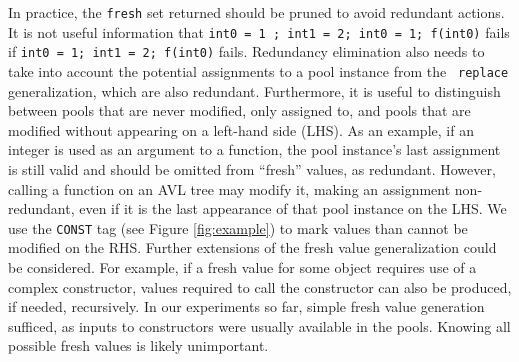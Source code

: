 In practice, the {\tt fresh} set returned should be pruned to avoid
redundant actions.  It is not useful information that {\tt int0 = 1 ; int1 = 2; int0 = 1; f(int0)} fails if {\tt int0 = 1;
  int1 = 2; f(int0)} fails.  Redundancy elimination also needs to take
into account the potential assignments to a pool instance from the {\tt
  replace} generalization, which are also redundant.  Furthermore, it
is useful to distinguish between pools that are never modified, only
assigned to, and pools that are modified without appearing on a
left-hand side (LHS).  As an example, if an integer is used as an argument
to a function, the pool instance's last assignment is still valid and
should be omitted from ``fresh'' values, as redundant.  However,
calling a function on an AVL tree may modify it, making an assignment
non-redundant, even if it is the last appearance of that pool instance
on the
LHS.
We use the {\tt CONST} tag (see Figure \ref{fig:example}) to mark
values than cannot be modified on the RHS.  Further extensions of the
fresh value generalization could be considered.  For example, if a
fresh value for some object requires use of a complex constructor,
values required to call the constructor can also be produced, if
needed, recursively.  In our experiments so
far, simple fresh value generation sufficed, as inputs to
constructors were usually available in the pools.  Knowing all possible
fresh values is likely unimportant.


